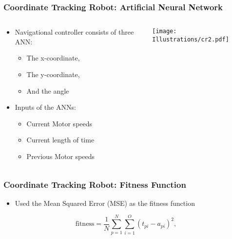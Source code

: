 \documentclass{beamer}
\begin{document}
\begin{frame}
  \frametitle{Coordinate Tracking Robot: Artificial Neural Network}
  \begin{columns}
  \begin{column}{0.5\textwidth}
\begin{itemize}
\item Navigational controller consists of three ANN:
\begin{itemize}
\item The x-coordinate,
\item The y-coordinate,
\item And the angle
\end{itemize}
\item Inputs of the ANNs:
\begin{itemize}
\item Current Motor speeds
\item Current length of time
\item Previous Motor speeds
\end{itemize}
\end{itemize}
\end{column}
\begin{column}{0.5\textwidth}
 \texttt{[image: Illustrations/cr2.pdf]}
       \\
\end{column}
\end{columns}
\end{frame}

\begin{frame}[fragile]
\frametitle{Coordinate Tracking Robot: Fitness Function}
\begin{itemize}
\item Used the Mean Squared Error (MSE) as the fitness function
\end{itemize}
  \[
  \textrm{fitness} = \frac{1}{N}\sum\limits_{p=1}^N\sum\limits_{i=1}^O (t_{pi} - a_{pi})^2,
\] 

\end{frame}

\end{document}
